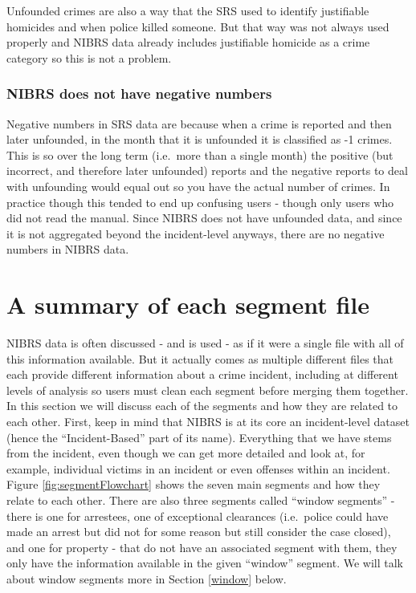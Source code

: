 \documentclass[
]{krantz}
\begin{document}
Unfounded crimes are also a way that the SRS used to
identify justifiable homicides and when police killed
someone. But that way was not always used properly and NIBRS
data already includes justifiable homicide as a crime
category so this is not a problem.

\subsubsection{NIBRS does not have negative
numbers}\label{nibrs-does-not-have-negative-numbers}

Negative numbers in SRS data are because when a crime is
reported and then later unfounded, in the month that it is
unfounded it is classified as -1 crimes. This is so over the
long term (i.e.~more than a single month) the positive (but
incorrect, and therefore later unfounded) reports and the
negative reports to deal with unfounding would equal out so
you have the actual number of crimes. In practice though
this tended to end up confusing users - though only users
who did not read the manual. Since NIBRS does not have
unfounded data, and since it is not aggregated beyond the
incident-level anyways, there are no negative numbers in
NIBRS data.

\section{A summary of each segment
file}\label{a-summary-of-each-segment-file}

NIBRS data is often discussed - and is used - as if it were
a single file with all of this information available. But it
actually comes as multiple different files that each provide
different information about a crime incident, including at
different levels of analysis so users must clean each
segment before merging them together. In this section we
will discuss each of the segments and how they are related
to each other. First, keep in mind that NIBRS is at its core
an incident-level dataset (hence the ``Incident-Based'' part
of its name). Everything that we have stems from the
incident, even though we can get more detailed and look at,
for example, individual victims in an incident or even
offenses within an incident. Figure
\ref{fig:segmentFlowchart} shows the seven main segments and
how they relate to each other. There are also three segments
called ``window segments'' - there is one for arrestees, one
of exceptional clearances (i.e.~police could have made an
arrest but did not for some reason but still consider the
case closed), and one for property - that do not have an
associated segment with them, they only have the information
available in the given ``window'' segment. We will talk
about window segments more in Section \ref{window} below.
\end{document}
